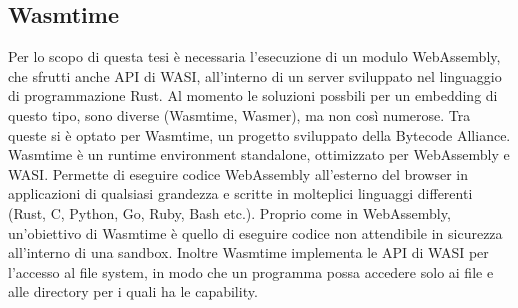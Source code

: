 \subsection{Wasmtime}
Per lo scopo di questa tesi è necessaria l'esecuzione di un modulo WebAssembly, che sfrutti anche API di WASI, all'interno di un server sviluppato nel linguaggio di programmazione Rust.
Al momento le soluzioni possbili per un embedding di questo tipo, sono diverse (Wasmtime, Wasmer), ma non così numerose.
Tra queste si è optato per Wasmtime, un progetto sviluppato della Bytecode Alliance.
\\Wasmtime è un runtime environment standalone, ottimizzato per WebAssembly e WASI.
Permette di eseguire codice WebAssembly all'esterno del browser in applicazioni di qualsiasi grandezza e scritte in molteplici linguaggi differenti (Rust, C, Python, Go, Ruby, Bash etc.).
Proprio come in WebAssembly, un'obiettivo di Wasmtime è quello di eseguire codice non attendibile in sicurezza all'interno di una sandbox.
Inoltre Wasmtime implementa le API di WASI per l'accesso al file system, in modo che un programma possa accedere solo ai file e alle directory per i quali ha le capability.
\cite*{wasmtime}
